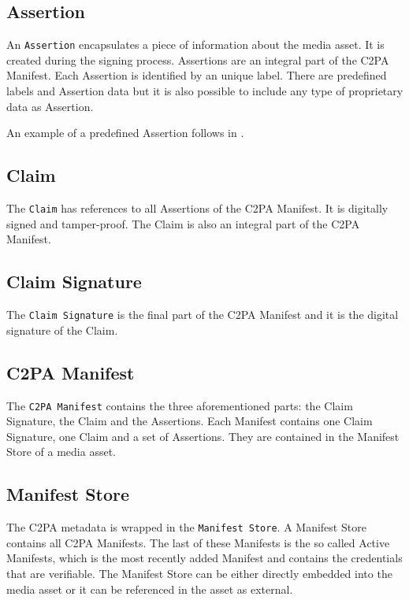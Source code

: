 \subsection{Assertion}

An \texttt{Assertion} encapsulates a piece of information about the media asset. It is created during the signing process. Assertions are an integral part of the C2PA Manifest. Each Assertion is identified by an unique label. There are predefined labels and Assertion data but it is also possible to include any type of proprietary data as Assertion. 

An example of a predefined Assertion follows in .

\subsection{Claim}

The \texttt{Claim} has references to all Assertions of the C2PA Manifest. It is digitally signed and tamper-proof. The Claim is also an integral part of the C2PA Manifest.

\subsection{Claim Signature}

The \texttt{Claim Signature} is the final part of the C2PA Manifest and it is the digital signature of the Claim.

\subsection{C2PA Manifest}

The \texttt{C2PA Manifest} contains the three aforementioned parts: the Claim Signature, the Claim and the Assertions. Each Manifest contains one Claim Signature, one Claim and a set of Assertions. They are contained in the Manifest Store of a media asset.

\subsection{Manifest Store}

The C2PA metadata is wrapped in the \texttt{Manifest Store}. A Manifest Store contains all C2PA Manifests. The last of these Manifests is the so called Active Manifests, which is the most recently added Manifest and contains the credentials that are verifiable. The Manifest Store can be either directly embedded into the media asset or it can be referenced in the asset as external.

